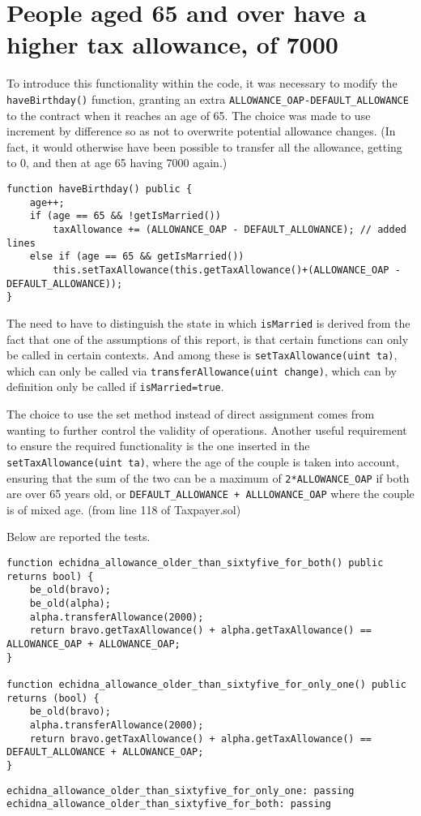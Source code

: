 \documentclass{article}
\begin{document}
\section{People aged 65 and over have a higher tax allowance, of 7000}
To introduce this functionality within the code, it was necessary to modify the \texttt{haveBirthday()} function, granting an extra \texttt{ALLOWANCE\_OAP-DEFAULT\_ALLOWANCE} to the contract when it reaches an age of 65.
The choice was made to use increment by difference so as not to overwrite potential allowance changes. (In fact, it would otherwise have been possible to transfer all the allowance, getting to 0, and then at age 65 having 7000 again.)
\begin{verbatim}
function haveBirthday() public {
    age++;
    if (age == 65 && !getIsMarried()) 
        taxAllowance += (ALLOWANCE_OAP - DEFAULT_ALLOWANCE); // added lines
    else if (age == 65 && getIsMarried()) 
        this.setTaxAllowance(this.getTaxAllowance()+(ALLOWANCE_OAP - DEFAULT_ALLOWANCE));
}
\end{verbatim} 
The need to have to distinguish the state in which \texttt{isMarried} is derived from the fact that one of the assumptions of this report, is that certain functions can only be called in certain contexts. And among these is \texttt{setTaxAllowance(uint ta)}, which can only be called via \texttt{transferAllowance(uint change)}, which can by definition only be called if \texttt{isMarried=true}.

The choice to use the set method instead of direct assignment comes from wanting to further control the validity of operations.
Another useful requirement to ensure the required functionality is the one inserted in the \texttt{setTaxAllowance(uint ta)}, where the age of the couple is taken into account, ensuring that the sum of the two can be a maximum of \texttt{2*ALLOWANCE\_OAP} if both are over 65 years old, or \texttt{DEFAULT\_ALLOWANCE + ALLLOWANCE\_OAP} where the couple is of mixed age. (from line 118 of Taxpayer.sol)

Below are reported the tests.
\begin{verbatim}
function echidna_allowance_older_than_sixtyfive_for_both() public returns bool) {
    be_old(bravo);
    be_old(alpha);
    alpha.transferAllowance(2000);
    return bravo.getTaxAllowance() + alpha.getTaxAllowance() == ALLOWANCE_OAP + ALLOWANCE_OAP;
}

function echidna_allowance_older_than_sixtyfive_for_only_one() public returns (bool) {
    be_old(bravo);
    alpha.transferAllowance(2000);
    return bravo.getTaxAllowance() + alpha.getTaxAllowance() == DEFAULT_ALLOWANCE + ALLOWANCE_OAP;
}
\end{verbatim} 
\begin{verbatim}
echidna_allowance_older_than_sixtyfive_for_only_one: passing
echidna_allowance_older_than_sixtyfive_for_both: passing
\end{verbatim}
\end{document}
